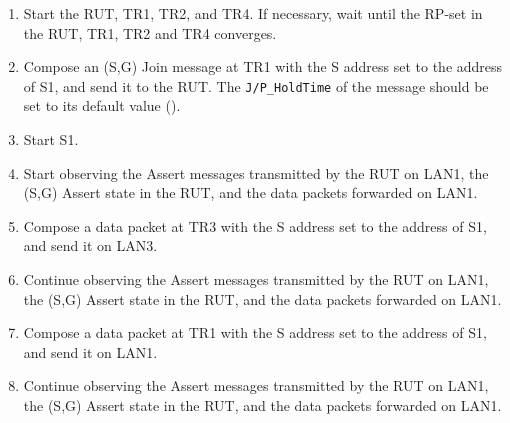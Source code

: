 \documentclass[11pt]{report}
\begin{document}
\begin{enumerate}

  \item Start the RUT, TR1, TR2, and TR4. If necessary, wait until the RP-set
  in the RUT, TR1, TR2 and TR4 converges.

  \item Compose an (S,G) Join message at TR1 with the S address set to the
  address of S1, and send it to the RUT.
  The \verb=J/P_HoldTime= of the message should be set to its default
  value ({\PimsmJPHoldTime}).

  \item Start S1.

  \item Start observing the Assert messages transmitted by the RUT on
  LAN1, the (S,G) Assert state in the RUT, and the data packets forwarded on
  LAN1. 

  \item Compose a data packet at TR3 with the S address set to the
  address of S1, and send it on LAN3.

  \item Continue observing the Assert messages transmitted by the RUT on
  LAN1, the (S,G) Assert state in the RUT, and the data packets forwarded on
  LAN1.

  \item Compose a data packet at TR1 with the S address set to the
  address of S1, and send it on LAN1.

  \item Continue observing the Assert messages transmitted by the RUT on
  LAN1, the (S,G) Assert state in the RUT, and the data packets forwarded on
  LAN1.

\end{enumerate}

\end{document}
